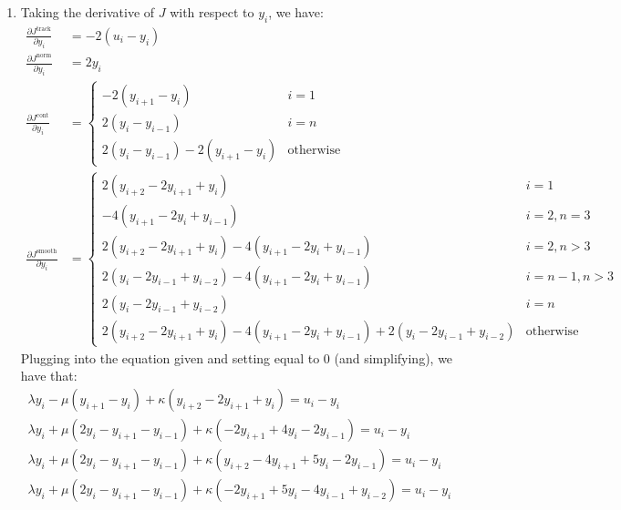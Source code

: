 \documentclass[12pt]{exam}
\begin{document}
\begin{questions}
\begin{solution}
  \begin{enumerate}[label=(\alph*)]
    \item Taking the derivative of $J$ with respect to $y_i$, we have:
    \begin{align*}
      \frac{\partial J^{\text{track}}}{\partial y_i} &= -2(u_i - y_i) \\
      \frac{\partial J^{\text{norm}}}{\partial y_i} &= 2y_i \\
      \frac{\partial J^{\text{cont}}}{\partial y_i} &= 
      \begin{cases}
      - 2(y_{i+1} - y_{i}) & i = 1 \\
        2(y_i - y_{i-1}) & i = n \\
        2(y_i - y_{i-1}) - 2(y_{i+1} - y_{i}) & \text{otherwise}
      \end{cases} \\
      \frac{\partial J^{\text{smooth}}}{\partial y_i} &= 
      \begin{cases}
          2(y_{i+2} - 2y_{i+1} + y_{i}) & i = 1 \\
          -4(y_{i+1} - 2y_{i} + y_{i-1}) & i = 2, n = 3\\
          2(y_{i+2} - 2y_{i+1} + y_{i}) - 4(y_{i+1} - 2y_{i} + y_{i-1}) & i = 2, n > 3 \\
          2(y_{i} - 2y_{i-1} + y_{i-2}) - 4(y_{i+1} - 2y_{i} + y_{i-1}) & i = n - 1, n > 3 \\
          2(y_{i} - 2y_{i-1} + y_{i-2}) & i = n \\
          2(y_{i+2} - 2y_{i+1} + y_{i}) - 4(y_{i+1} - 2y_{i} + y_{i-1}) + 2(y_i - 2y_{i-1} + y_{i-2}) & \text{otherwise}
      \end{cases}
    \end{align*}
    Plugging into the equation given and setting equal to $0$ (and simplifying), we have that:
    \begin{align*}
      \lambda y_i - \mu(y_{i+1} - y_i) + \kappa(y_{i+2} - 2y_{i+1} + y_i) = u_i - y_i \tag{$i = 1$} \\
      \lambda y_i + \mu(2y_i - y_{i+1} - y_{i-1}) + \kappa(-2y_{i+1} + 4y_{i} -2y_{i-1}) = u_i - y_i \tag{$i=2, n = 3$} \\
      \lambda y_i + \mu(2y_i - y_{i+1} - y_{i-1}) + \kappa(y_{i+2} - 4y_{i+1} + 5y_{i} -2y_{i-1} ) = u_i - y_i \tag{$i = 2, n > 3$} \\
      \lambda y_i + \mu(2y_i - y_{i+1} - y_{i-1}) + \kappa(-2y_{i+1} + 5y_i -4y_{i-1} + y_{i-2}) = u_i - y_i \tag{$i = n - 1, n > 3$} \\

\end{align*}
\end{enumerate}
\end{solution}
\end{questions}
\end{document}
